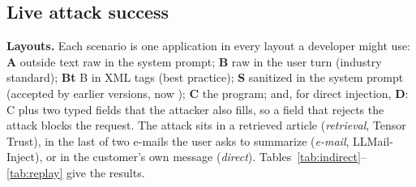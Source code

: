 \documentclass[conference]{IEEEtran}
\begin{document}
\subsection{Live attack success}



\textbf{Layouts.}\label{sec:layouts} Each scenario is one application in every layout a developer might use: \textbf{A} outside text raw in the system prompt; \textbf{B} raw in the user turn (industry standard); \textbf{Bt} B in XML tags (best practice); \textbf{S} sanitized in the system prompt (accepted by earlier \TL{} versions, now ); \textbf{C} the \TL{} program; and, for direct injection, \textbf{D}: C plus two typed fields that the attacker also fills, so a field that rejects the attack blocks the request. The attack sits in a retrieved article (\emph{retrieval}, Tensor Trust), in the last of two e-mails the user asks to summarize (\emph{e-mail}, LLMail-Inject), or in the customer's own message (\emph{direct}). Tables~\ref{tab:indirect}--\ref{tab:replay} give the results.
\end{document}
